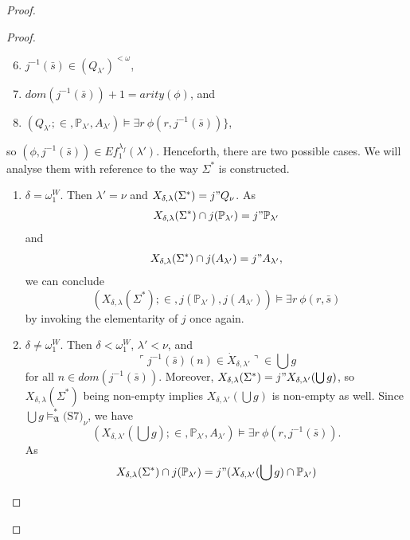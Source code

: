 \documentclass[12pt]{article}
\numberwithin{equation}{section}
\begin{document}
\begin{proof}
\begin{proof}
\begin{enumerate}[label=<$k$> $\eq$ \arabic* :, leftmargin=70pt]
    \begin{enumerate}[label=(\alph*)]
        \setcounter{enumii}{5}
        \item $j^{-1}(\bar{s}) \in (Q_{\lambda'})^{< \omega}$, 
        \item $dom(j^{-1}(\bar{s})) + 1 = arity(\phi)$, and
        \item $(Q_{\lambda'}; \in, \mathbb{P}_{\lambda'}, A_{\lambda'}) \models \exists r \ \phi(r, j^{-1}(\bar{s}))\}$,
    \end{enumerate}
    so $(\phi, j^{-1}(\bar{s})) \in Ef_1^{\lambda_f}(\lambda')$. Henceforth, there are two possible cases. We will analyse them with reference to the way $\Sigma^*$ is constructed. 
    \begin{enumerate}[label=Case \arabic*:, leftmargin=50pt]
        \item\label{c7c1} $\delta = \omega_1^W$. Then $\lambda' = \nu$ and $X_{\delta, \lambda}(\Sigma^*) = j" Q_{\nu}$. As 
        \begin{align*}
            X_{\delta, \lambda}(\Sigma^*) \cap j(\mathbb{P}_{\lambda'}) = j" \mathbb{P}_{\lambda'}
        \end{align*}
        and
        \begin{align*}
            X_{\delta, \lambda}(\Sigma^*) \cap j(A_{\lambda'}) = j" A_{\lambda'},
        \end{align*}
        we can conclude 
        \begin{equation*}
            (X_{\delta, \lambda}(\Sigma^*); \in, j(\mathbb{P}_{\lambda'}), j(A_{\lambda'})) \models \exists r \ \phi(r, \bar{s})
        \end{equation*} 
        by invoking the elementarity of $j$ once again.
        \item $\delta \neq \omega_1^W$. Then $\delta < \omega_1^W$, $\lambda' < \nu$, and $$\ulcorner j^{-1}(\bar{s})(n) \in \dot{X}_{\delta, \lambda'} \urcorner \in \bigcup g$$ for all $n \in dom(j^{-1}(\bar{s}))$. Moreover, $X_{\delta, \lambda}(\Sigma^*) = j" X_{\delta, \lambda'}(\bigcup g)$, so $X_{\delta, \lambda}(\Sigma^*)$ being non-empty implies $X_{\delta, \lambda'}(\bigcup g)$ is non-empty as well. Since $\bigcup g \models^*_{\mathfrak{A}} \text{(S7)}_{\nu}$, we have $$(X_{\delta, \lambda'}(\bigcup g); \in, \mathbb{P}_{\lambda'}, A_{\lambda'}) \models \exists r \ \phi(r, j^{-1}(\bar{s})).$$ As 
        \begin{align*}
            X_{\delta, \lambda}(\Sigma^*) \cap j(\mathbb{P}_{\lambda'}) = j" (X_{\delta, \lambda'}(\bigcup g) \cap \mathbb{P}_{\lambda'})

\end{align*}
\end{enumerate}
\end{enumerate}
\end{proof}
\end{proof}
\end{document}
